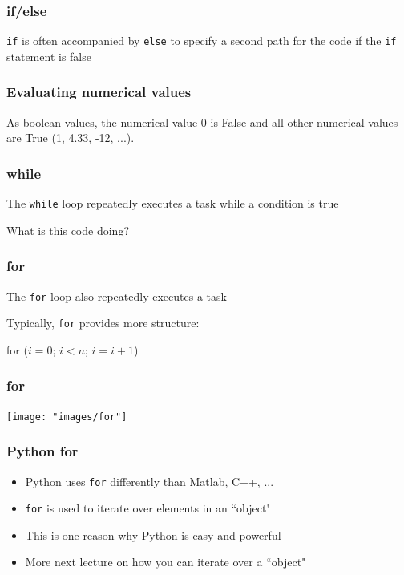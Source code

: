 \documentclass{beamer}
\begin{document}
\begin{frame}
\frametitle{if/else}
\texttt{if} is often accompanied by \texttt{else} to specify a second path for the code if the \texttt{if} statement is false



\end{frame}

\begin{frame}
\frametitle{Evaluating numerical values}

As boolean values, the numerical value 0 is False and all other numerical values are True (1, 4.33, -12, ...).



\end{frame}

\begin{frame}
\frametitle{while}
The \texttt{while} loop repeatedly executes a task while a condition is true



What is this code doing?

\end{frame}

\begin{frame}
\frametitle{for}
The \texttt{for} loop also repeatedly executes a task

\vspace{0.1in}

Typically, \texttt{for} provides more structure:

\vspace{0.1in}

\centering
for ($i = 0$; $i < n$; $i = i + 1$)

\end{frame}

\begin{frame}
\frametitle{for}

\centering
\texttt{[image: "images/for"]}
\end{frame}

\begin{frame}
\frametitle{Python for}
\begin{itemize}
\setlength{\itemsep}{0.2in}
\item{Python uses \texttt{for} differently than Matlab, C++, ...}
\item{\texttt{for} is used to iterate over elements in an ``object"}
\item{This is one reason why Python is easy and powerful}
\item{More next lecture on how you can iterate over a ``object"}
\end{itemize}

\end{frame}
\end{document}
